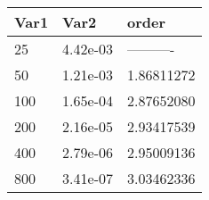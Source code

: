 \begin{tabular}{lll}
Var1 & Var2 & order \\ 
\hline 
25 & 4.42e-03 & ---------- \\ 
50 & 1.21e-03 & 1.86811272 \\ 
100 & 1.65e-04 & 2.87652080 \\ 
200 & 2.16e-05 & 2.93417539 \\ 
400 & 2.79e-06 & 2.95009136 \\ 
800 & 3.41e-07 & 3.03462336 \\ 
\hline 
\end{tabular}